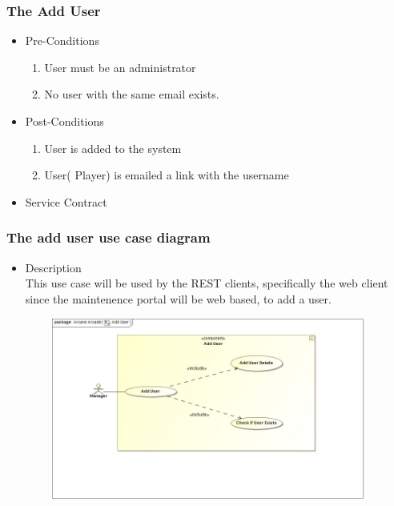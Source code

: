 \documentclass[english]{article}
\begin{document}
		
		\subsubsection{The Add User}
		
			\begin{itemize}
	
		
		\item Pre-Conditions
			\begin{enumerate}
				\item User must be an administrator
				\item No user with the same email exists.
			\end{enumerate}
		\item Post-Conditions
			\begin{enumerate}
			\item User is added to the system
			\item User( Player) is emailed a link with the username
						
			\end{enumerate}
		\item Service Contract
			\begin{figure}
			
			\end{figure}

\end{itemize}
		
		
		\subsubsection* {The add user use case diagram}
		\begin{itemize}
			\item Description\\
			This use case will be used by the REST clients, specifically the web client since the maintenence 					portal will be web based, to add a user.
		\end{itemize}
		\includegraphics[width=14cm,height=6cm,keepaspectratio]{addUser.jpg}
		
\end{document}

